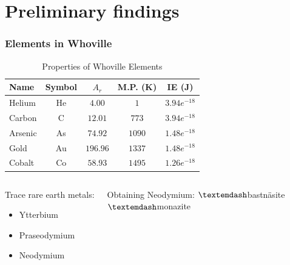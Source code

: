\documentclass{beamer}
\begin{document}
\section{Preliminary findings}
\begin{frame}
    \frametitle{Elements in Whoville}

    \vspace{1cm} %
    \begin{table}[h]
    \centering
    \begin{tabular}{lcccc} \bottomrule[2pt]
        Name & Symbol & $A_r$ & M.P. (K) & IE (J) \\ \bottomrule 
        Helium & He & $4.00$ & $1$ & $3.94e^{-18}$ \\
        Carbon & C & $12.01$ & $773$ & $3.94e^{-18}$ \\
        Arsenic & As & $74.92$ & $1090$ & $1.48e^{-18}$ \\
        Gold & Au & $196.96$ & $1337$ & $1.48e^{-18}$ \\
        Cobalt & Co & $58.93$ & $1495$ & $1.26e^{-18}$ \\
    \bottomrule[2pt]
    \end{tabular}
    \caption{Properties of Whoville Elements}
    \end{table}

\vspace{-0.6cm} %

    \begin{columns}[t]
    \column{4.5cm}
    \begin{block}{Trace rare earth metals:}
    \begin{itemize}
        \item{Ytterbium}
        \item{Praseodymium}
        \item{Neodymium}
    \end{itemize}
    \end{block}
    \column{4.5cm}
    \begin{block}{Obtaining Neodymium:}
        \vspace{0.15cm}
        $\textemdash$bastn\"{a}site \\
        $\textemdash${monazite} \\
    \end{block}
    \end{columns}


\end{frame}
\end{document}
